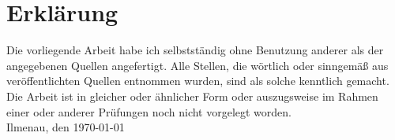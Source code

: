 

\chapter*{Erklärung}

Die vorliegende Arbeit habe ich selbstständig ohne Benutzung anderer als der
angegebenen Quellen angefertigt. Alle Stellen, die wörtlich oder sinngemäß
aus veröffentlichten Quellen entnommen wurden, sind als solche
kenntlich gemacht. Die Arbeit ist in gleicher oder ähnlicher Form oder
auszugsweise im Rahmen einer oder anderer Prüfungen noch nicht vorgelegt
worden.
\\[2cm]
Ilmenau, den \today \hfill \namedesautors
